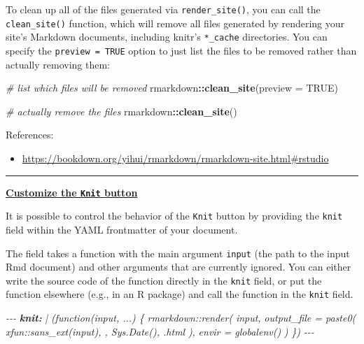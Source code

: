 \documentclass[
  a4paper,
  twoside,
  openright]{book}
\newenvironment{Shaded}{\begin{snugshade}}{\end{snugshade}}
\newcommand{\AnnotationTok}[1]{\textcolor[rgb]{0.56,0.35,0.01}{\textbf{\textit{#1}}}}
\newcommand{\AttributeTok}[1]{\textcolor[rgb]{0.13,0.29,0.53}{#1}}
\newcommand{\CommentTok}[1]{\textcolor[rgb]{0.56,0.35,0.01}{\textit{#1}}}
\newcommand{\ConstantTok}[1]{\textcolor[rgb]{0.56,0.35,0.01}{#1}}
\newcommand{\FunctionTok}[1]{\textcolor[rgb]{0.13,0.29,0.53}{\textbf{#1}}}
\newcommand{\NormalTok}[1]{#1}
\newcommand{\SpecialCharTok}[1]{\textcolor[rgb]{0.81,0.36,0.00}{\textbf{#1}}}
\providecommand{\tightlist}{%
  \setlength{\itemsep}{0pt}\setlength{\parskip}{0pt}}
\theoremstyle{definition}
\theoremstyle{definition}
\theoremstyle{definition}
\theoremstyle{definition}
\theoremstyle{remark}
\begin{document}
To clean up all of the files generated via \texttt{render\_site()}, you can call the \texttt{clean\_site()} function, which will remove all files generated by rendering your site's Markdown documents, including knitr's \texttt{*\_cache} directories. You can specify the \texttt{preview\ =\ TRUE} option to just list the files to be removed rather than actually removing them:

\begin{Shaded}
\begin{Highlighting}[]
\CommentTok{\# list which files will be removed}
\NormalTok{rmarkdown}\SpecialCharTok{::}\FunctionTok{clean\_site}\NormalTok{(}\AttributeTok{preview =} \ConstantTok{TRUE}\NormalTok{)}

\CommentTok{\# actually remove the files}
\NormalTok{rmarkdown}\SpecialCharTok{::}\FunctionTok{clean\_site}\NormalTok{()}
\end{Highlighting}
\end{Shaded}

References:

\begin{itemize}
\tightlist
\item
  \url{https://bookdown.org/yihui/rmarkdown/rmarkdown-site.html\#rstudio}
\end{itemize}

\begin{center}\rule{0.5\linewidth}{0.5pt}\end{center}

\href{https://bookdown.org/yihui/rmarkdown-cookbook/custom-knit.html}{\textbf{Customize the \texttt{Knit} button}}

It is possible to control the behavior of the \texttt{Knit} button by providing the \texttt{knit} field within the YAML frontmatter of your document.

The field takes a function with the main argument \texttt{input} (the path to the input Rmd document) and other arguments that are currently ignored. You can either write the source code of the function directly in the \texttt{knit} field, or put the function elsewhere (e.g., in an R package) and call the function in the \texttt{knit} field.

\begin{Shaded}
\begin{Highlighting}[]
\CommentTok{{-}{-}{-}}
\AnnotationTok{knit:}\CommentTok{ |}
\CommentTok{  (function(input, ...) \{}
\CommentTok{    rmarkdown::render(}
\CommentTok{      input,}
\CommentTok{      output\_file = paste0(}
\CommentTok{        xfun::sans\_ext(input), \textquotesingle{}{-}\textquotesingle{}, Sys.Date(), \textquotesingle{}.html\textquotesingle{}}
\CommentTok{      ),}
\CommentTok{      envir = globalenv()}
\CommentTok{    )}
\CommentTok{  \})}
\CommentTok{{-}{-}{-}}
\end{Highlighting}
\end{Shaded}
\end{document}
